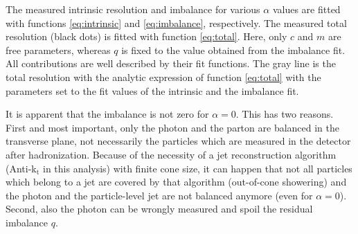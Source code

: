The measured intrinsic resolution and imbalance for various $\alpha$ values are fitted with functions \eqref{eq:intrinsic} and \eqref{eq:imbalance}, respectively.
The measured total resolution (black dots) is fitted with function \eqref{eq:total}. Here, only $c$ and $m$ are free parameters, 
whereas $q$ is fixed to the value obtained from the imbalance fit. 
All contributions are well described by their fit functions. 
The gray line is the total resolution with the analytic expression of function \eqref{eq:total} with the parameters set to the fit values of the intrinsic and the imbalance fit. 

It is apparent that the imbalance is not zero for $\alpha=0$. This has two reasons.
First and most important, only the photon and the parton are balanced in the transverse plane, 
not necessarily the particles which are measured in the detector after hadronization. 
Because of the necessity of a jet reconstruction algorithm (Anti-k$_{\text{t}}$ in this analysis) with finite cone size, 
it can happen that not all particles which belong to a jet are covered by 
that algorithm (out-of-cone showering) and the photon and the particle-level jet are not balanced anymore (even for $\alpha = 0$). Second, also the photon \pt can 
be wrongly measured and spoil the residual imbalance $q$. 

